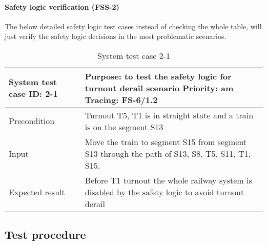 \paragraph{Safety logic verification (FSS-2)} The below detailed safety logic test cases instead of checking the whole table, will just verify the safety logic decisions in the most problematic scenarios. 
\begin{table}[H]
	\caption{System test case 2-1}
	\label{table:TCase-FSS2-01}
	\begin{center}
		\renewcommand{\arraystretch}{1.8}
		\begin{tabu} 
			to 0.9 \textwidth
			{  X[0.3, l] X[l] }
			\toprule
			System test case ID: 2-1 & Purpose: to test the safety logic for turnout derail scenario  \newline Priority: am \newline Tracing: FS-6/1.2 \\ \midrule
			Precondition             & Turnout T5, T1 is in straight state and a train is on the segment S13                                           \\
			Input                    & Move the train to segment S15 from segment S13 through the path of S13, S8, T5, S11, T1, S15.                   \\
			Expected result          & Before T1 turnout the whole railway system is disabled by the safety logic to avoid turnout derail              \\ \bottomrule
		\end{tabu}
	\end{center}
\end{table}

\subsection{Test procedure} 
